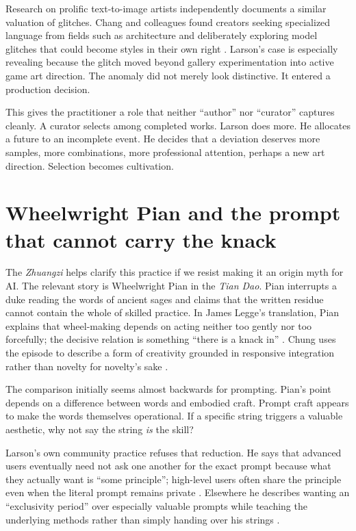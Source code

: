 \documentclass[11pt]{article}
\begin{document}
Research on prolific text-to-image artists independently documents a similar valuation of glitches. Chang and colleagues found creators seeking specialized language from fields such as architecture and deliberately exploring model glitches that could become styles in their own right \cite{ChangEtAl2023PromptArtists}. Larson's case is especially revealing because the glitch moved beyond gallery experimentation into active game art direction. The anomaly did not merely look distinctive. It entered a production decision.

This gives the practitioner a role that neither ``author'' nor ``curator'' captures cleanly. A curator selects among completed works. Larson does more. He allocates a future to an incomplete event. He decides that a deviation deserves more samples, more combinations, more professional attention, perhaps a new art direction. Selection becomes cultivation.

\section{Wheelwright Pian and the prompt that cannot carry the knack}
The \emph{Zhuangzi} helps clarify this practice if we resist making it an origin myth for AI. The relevant story is Wheelwright Pian in the \emph{Tian Dao}. Pian interrupts a duke reading the words of ancient sages and claims that the written residue cannot contain the whole of skilled practice. In James Legge's translation, Pian explains that wheel-making depends on acting neither too gently nor too forcefully; the decisive relation is something ``there is a knack in'' \cite{Legge1891Taoism}. Chung uses the episode to describe a form of creativity grounded in responsive integration rather than novelty for novelty's sake \cite{Chung2020Originality}.

The comparison initially seems almost backwards for prompting. Pian's point depends on a difference between words and embodied craft. Prompt craft appears to make the words themselves operational. If a specific string triggers a valuable aesthetic, why not say the string \emph{is} the skill?

Larson's own community practice refuses that reduction. He says that advanced users eventually need not ask one another for the exact prompt because what they actually want is ``some principle''; high-level users often share the principle even when the literal prompt remains private \cite{Larson2022}. Elsewhere he describes wanting an ``exclusivity period'' over especially valuable prompts while teaching the underlying methods rather than simply handing over his strings \cite{Larson2022}.
\end{document}
